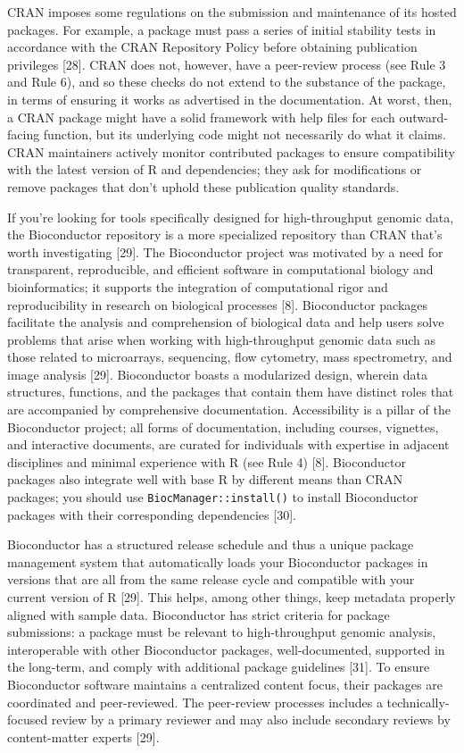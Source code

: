 \documentclass[10pt,letterpaper]{article}
\begin{document}
CRAN imposes some regulations on the submission and maintenance of its
hosted packages. For example, a package must pass a series of initial
stability tests in accordance with the CRAN Repository Policy before
obtaining publication privileges {[}28{]}. CRAN does not, however, have
a peer-review process (see Rule 3 and Rule 6), and so these checks do
not extend to the substance of the package, in terms of ensuring it
works as advertised in the documentation. At worst, then, a CRAN package
might have a solid framework with help files for each outward-facing
function, but its underlying code might not necessarily do what it
claims. CRAN maintainers actively monitor contributed packages to ensure
compatibility with the latest version of R and dependencies; they ask
for modifications or remove packages that don't uphold these publication
quality standards.

If you're looking for tools specifically designed for high-throughput
genomic data, the Bioconductor repository is a more specialized
repository than CRAN that's worth investigating {[}29{]}. The
Bioconductor project was motivated by a need for transparent,
reproducible, and efficient software in computational biology and
bioinformatics; it supports the integration of computational rigor and
reproducibility in research on biological processes {[}8{]}.
Bioconductor packages facilitate the analysis and comprehension of
biological data and help users solve problems that arise when working
with high-throughput genomic data such as those related to microarrays,
sequencing, flow cytometry, mass spectrometry, and image analysis
{[}29{]}. Bioconductor boasts a modularized design, wherein data
structures, functions, and the packages that contain them have distinct
roles that are accompanied by comprehensive documentation. Accessibility
is a pillar of the Bioconductor project; all forms of documentation,
including courses, vignettes, and interactive documents, are curated for
individuals with expertise in adjacent disciplines and minimal
experience with R (see Rule 4) {[}8{]}. Bioconductor packages also
integrate well with base R by different means than CRAN packages; you
should use \texttt{BiocManager::install()} to install Bioconductor
packages with their corresponding dependencies {[}30{]}.

Bioconductor has a structured release schedule and thus a unique package
management system that automatically loads your Bioconductor packages in
versions that are all from the same release cycle and compatible with
your current version of R {[}29{]}. This helps, among other things, keep
metadata properly aligned with sample data. Bioconductor has strict
criteria for package submissions: a package must be relevant to
high-throughput genomic analysis, interoperable with other Bioconductor
packages, well-documented, supported in the long-term, and comply with
additional package guidelines {[}31{]}. To ensure Bioconductor software
maintains a centralized content focus, their packages are coordinated
and peer-reviewed. The peer-review processes includes a
technically-focused review by a primary reviewer and may also include
secondary reviews by content-matter experts {[}29{]}.
\end{document}
